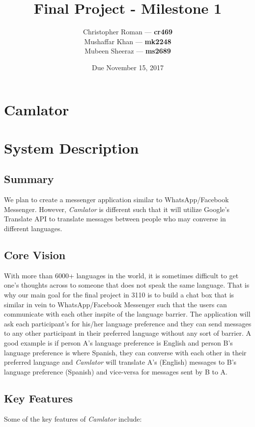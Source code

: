 \documentclass[12pt, letterpaper]{article}
\begin{document}
\title{Final Project - Milestone 1}
\author{Christopher Roman --- \textbf{cr469} \\
	    Mushaffar Khan --- \textbf{mk2248}\\
	    Mubeen Sheeraz --- \textbf{ms2689}}
\date{Due November 15, 2017}
\maketitle

\newpage

\section*{Camlator}

\section{System Description}
\subsection{Summary}
We plan to create a messenger application similar to WhatsApp/Facebook Messenger. However, \textit{Camlator} is different such that it will utilize Google's Translate API to translate messages between people who may converse in different languages.  
    
\subsection{Core Vision} 
With more than 6000+ languages in the world, it is sometimes difficult to get one’s
thoughts across to someone that does not speak the same language. That is why our main goal for the final project in 3110 is to build a chat box that is similar in vein to WhatsApp/Facebook Messenger such that the users can communicate with each other inspite of the language barrier. The application will ask each participant's for his/her language preference and they can send messages to any other participant in their preferred language without any sort of barrier. A good example is if person A's language preference is English and person B's language preference is where Spanish, they can converse with each other in their preferred language and \textit{Camlator} will translate A's (English) messages to B's language preference (Spanish) and vice-versa for messages sent by B to A.

\subsection{Key Features}
Some of the key features of \textit{Camlator} include: 
\end{document}
